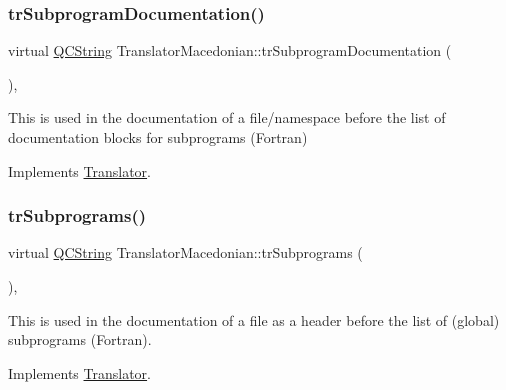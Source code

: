 \mbox{\label{class_translator_macedonian_a04ac781c3d7e2712b6636af7b543c04f}} 
\subsubsection{\texorpdfstring{trSubprogramDocumentation()}{trSubprogramDocumentation()}}
{\footnotesize\ttfamily virtual \mbox{\hyperlink{class_q_c_string}{Q\+C\+String}} Translator\+Macedonian\+::tr\+Subprogram\+Documentation (\begin{DoxyParamCaption}{ }\end{DoxyParamCaption})\hspace{0.3cm}{\ttfamily [inline]}, {\ttfamily [virtual]}}

This is used in the documentation of a file/namespace before the list of documentation blocks for subprograms (Fortran) 

Implements \mbox{\hyperlink{class_translator}{Translator}}.

\mbox{\label{class_translator_macedonian_ac418532b8c2560eacf53cc5faa2be2c5}} 
\subsubsection{\texorpdfstring{trSubprograms()}{trSubprograms()}}
{\footnotesize\ttfamily virtual \mbox{\hyperlink{class_q_c_string}{Q\+C\+String}} Translator\+Macedonian\+::tr\+Subprograms (\begin{DoxyParamCaption}{ }\end{DoxyParamCaption})\hspace{0.3cm}{\ttfamily [inline]}, {\ttfamily [virtual]}}

This is used in the documentation of a file as a header before the list of (global) subprograms (Fortran). 

Implements \mbox{\hyperlink{class_translator}{Translator}}.

\mbox{\label{class_translator_macedonian_a125a9e6604405f5ae3ac62a6c0c0a713}} 
